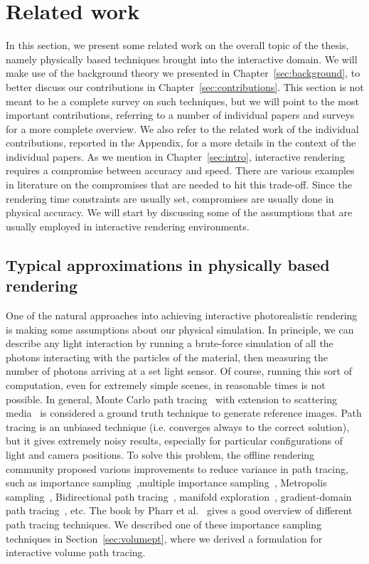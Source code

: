 \chapter{Related work}



%
\label{sec:related}
%
In this section, we present some related work on the overall topic of the thesis, namely physically based techniques brought into the interactive domain. We will make use of the background theory we presented in Chapter~\ref{sec:background}, to better discuss our contributions in Chapter~\ref{sec:contributions}. This section is not meant to be a complete survey on such techniques, but we will point to the most important contributions, referring to a number of individual papers and surveys for a more complete overview. We also refer to the related work of the individual contributions, reported in the Appendix, for a more details in the context of the individual papers. 
%
As we mention in Chapter~\ref{sec:intro}, interactive rendering requires a compromise between accuracy and speed. There are various examples in literature on the compromises that are needed to hit this trade-off. Since the rendering time constraints are usually set, compromises are usually done in physical accuracy. We will start by discussing some of the assumptions that are usually employed in interactive rendering environments. 
%
\section{Typical approximations in physically based rendering}

One of the natural approaches into achieving interactive photorealistic rendering is making some assumptions about our physical simulation. In principle, we can describe any light interaction by running a brute-force simulation of all the photons interacting with the particles of the material, then measuring the number of photons arriving at a set light sensor. Of course, running this sort of computation, even for extremely simple scenes, in reasonable times is not possible. In general, Monte Carlo path tracing~\cite{Kajiya1986} with extension to scattering media~\cite{Rushmeier1988} is considered a ground truth technique to generate reference images. Path tracing is an unbiased technique (i.e. converges always to the correct solution), but it gives extremely noisy results, especially for particular configurations of light and camera positions. To solve this problem, the offline rendering community proposed various improvements to reduce variance in path tracing, such as importance sampling~\cite{Kirk1991},multiple importance sampling~\cite{Veach1995}, Metropolis sampling~\cite{Veach1995}, Bidirectional path tracing~\cite{Veach1997}, manifold exploration~\cite{Jakob2012}, gradient-domain path tracing~\cite{Kettunen2015}, etc. The book by Pharr et al.~\cite{Pharr2017} gives a good overview of different path tracing techniques. We described one of these importance sampling techniques in Section~\ref{sec:volumept}, where we derived a formulation for interactive volume path tracing.

